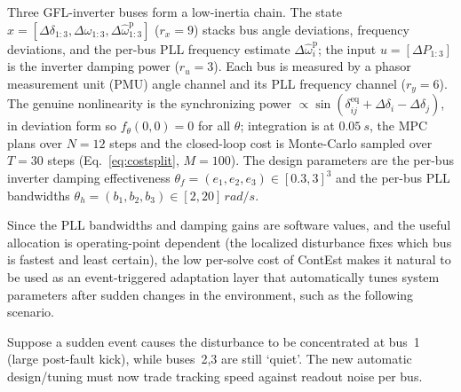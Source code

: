 \documentclass[twocolumn,amsthm]{autart}
\begin{document}
Three GFL-inverter buses form a low-inertia chain. The state
$x=[\Delta\delta_{1:3},\Delta\omega_{1:3},\Delta\hat\omega^{\mathrm p}_{1:3}]$
($r_x=9$) stacks bus angle deviations, frequency deviations, and the per-bus PLL frequency estimate $\Delta\hat\omega^{\mathrm p}_i$; the input
$u=[\Delta P_{1:3}]$ is the inverter damping power ($r_u=3$). Each bus is measured
by a phasor measurement unit (PMU) angle channel and its PLL frequency channel
($r_y=6$). The genuine
nonlinearity is the synchronizing power $\propto\sin(\delta^{\mathrm{eq}}_{ij}+
\Delta\delta_i-\Delta\delta_j)$, in deviation form so $f_\theta(0,0)=0$ for
all $\theta$; integration is at $\SI{0.05}{s}$, the MPC plans over $N=12$ steps and
the closed-loop cost is Monte-Carlo sampled over $T=30$ steps (Eq.~\eqref{eq:costsplit}, $M=100$). The design parameters
are the per-bus inverter damping effectiveness
$\theta_f=(e_1,e_2,e_3)\in[0.3,3]^3$ and the per-bus PLL bandwidths
$\theta_h=(b_1,b_2,b_3)\in[2,20]\,\si{rad/s}$. 


Since the PLL bandwidths and damping gains are software values, and the useful allocation is operating-point dependent (the localized disturbance
fixes which bus is fastest and least certain), the low per-solve cost of
ContEst makes it natural to be used as an event-triggered adaptation layer that automatically tunes system parameters after sudden changes in the environment, such as the following scenario.

Suppose a sudden event causes the disturbance to be concentrated at
bus~1 (large post-fault kick), while buses~2,3 are still `quiet'. The new automatic design/tuning
must now trade tracking speed against readout noise per bus. 
\end{document}
